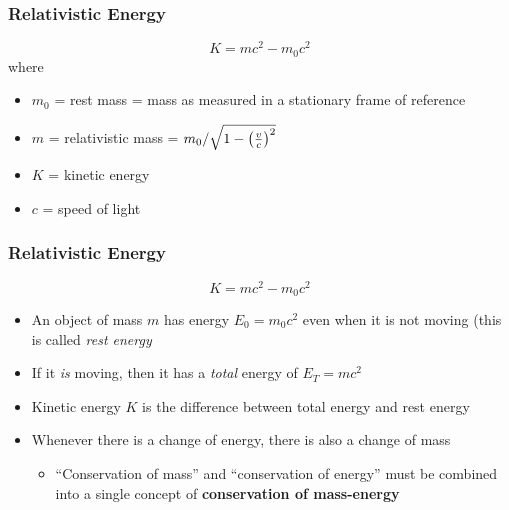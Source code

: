\documentclass[12pt,compress,aspectratio=169]{beamer}
\newcommand{\bigsqrt}{\ensuremath\sqrt{1-\left(\frac{v}{c}\right)^2}}
\begin{document}
\begin{frame}
  \frametitle{Relativistic Energy}
  {\LARGE
    \begin{displaymath}
      \boxed{K=mc^2-m_0c^2}
    \end{displaymath}
  }
  where
  \begin{itemize}
  \item $m_0$ = rest mass = mass as measured in a stationary frame of reference
  \item $m$ = relativistic mass = $m_0/\bigsqrt$
  \item $K$ = kinetic energy
  \item $c$ = speed of light
  \end{itemize}
\end{frame}

\begin{frame}
  \frametitle{Relativistic Energy}
  {\LARGE
    \begin{displaymath}
      \boxed{K=mc^2-m_0c^2}
    \end{displaymath}
  }
  \begin{itemize}
  \item An object of mass $m$ has energy $E_0=m_0c^2$ even when it is not
    moving (this is called \emph{rest energy}
  \item If it \emph{is} moving, then it has a \emph{total} energy of
    $E_T=mc^2$
  \item Kinetic energy $K$ is the difference between total energy and rest
    energy
  \item Whenever there is a change of energy, there is also a change of mass
    \begin{itemize}
    \item ``Conservation of mass'' and ``conservation of energy'' must be
      combined into a single concept of \textbf{conservation of mass-energy}
    \end{itemize}
  \end{itemize}
\end{frame}
\end{document}
